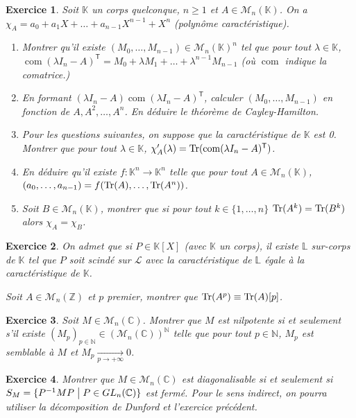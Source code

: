 \documentclass[12pt]{article}
\newtheorem{exercise}{Exercice}[section]
\theoremstyle{remark}
\theoremstyle{remark}
\newcommand{\K}{\mathbb{K}} \newcommand{\R}{\mathbb{R}}
\newcommand{\C}{\mathbb{C}} \newcommand{\Q}{\mathbb{Q}}
\newcommand{\N}{\mathbb{N}} \newcommand{\Z}{\mathbb{Z}}
\newcommand{\M}{\mathcal{M}} \renewcommand{\L}{\mathcal{L}}
\DeclareMathOperator{\com}{com} \DeclareMathOperator{\conv}{conv}
\begin{document}
\begin{exercise}
	Soit $\K$ un corps quelconque, $n\geqslant1$ et $A\in\M_{n}(\K)$. On a $\chi_{A}=a_{0}+a_{1}X+\dots+a_{n-1}X^{n-1}+X^{n}$ (polynôme caractéristique).
	\begin{enumerate}
		\item Montrer qu'il existe $(M_{0},\dots,M_{n-1})\in\M_{n}(\K)^{n}$ tel que pour tout $\lambda\in\K$, $\com(\lambda I_{n}-A)^{\mathsf{T}}=M_{0}+\lambda M_{1}+\dots+\lambda^{n-1}M_{n-1}$ (où $\com$ indique la comatrice.)
		\item En formant $(\lambda I_{n}-A)\com(\lambda I_{n}-A)^{\mathsf{T}}$, calculer $(M_{0},\dots,M_{n-1})$ en fonction de $A,A^{2},\dots,A^{n}$. En déduire le théorème de Cayley-Hamilton.
		\item Pour les questions suivantes, on suppose que la caractéristique de $\K$ est 0. Montrer que pour tout $\lambda\in\K$, $\chi_{A}'(\lambda)=\Tr(\com(\lambda I_{n}-A)^{\mathsf{T}})$.
		\item En déduire qu'il existe $f:\K^{n}\to\K^{n}$ telle que pour tout $A\in\M_{n}(\K)$, $(a_{0},\dots,a_{n-1}) = f(\operatorname{Tr}(A),\dots,\operatorname{Tr}(A^{n}))$.
		\item Soit $B\in\M_{n}(\K)$, montrer que si pour tout $k\in\{1,\dots,n\}$ $\operatorname{Tr}(A^{k})=\operatorname{Tr}(B^{k})$ alors $\chi_{A}=\chi_{B}$.
	\end{enumerate}
\end{exercise}

\begin{exercise}
	On admet que si $P\in\K[X]$ (avec $\K$ un corps), il existe $\mathbb{L}$ sur-corps de $\K$ tel que $P$ soit scindé sur $\L$ avec la caractéristique de $\mathbb{L}$ égale à la caractéristique de $\K$.

	Soit $A\in\M_{n}(\Z)$ et $p$ premier, montrer que $\operatorname{Tr}(A^{p})\equiv\operatorname{Tr}(A)[p]$.
\end{exercise}

\begin{exercise}
	Soit $M\in\M_{n}(\C)$. Montrer que $M$ est nilpotente si et seulement s'il existe $(M_{p})_{p\in\N}\in(\M_{n}(\C))^{\N}$ telle que pour tout $p\in\N$, $M_{p}$ est semblable à $M$ et $M_{p}\xrightarrow[p\to+\infty]{}0$.
\end{exercise}

\begin{exercise}
	Montrer que $M\in\M_{n}(\C)$ est diagonalisable si et seulement si $S_{M}=\{P^{-1}MP\bigm| P\in GL_{n}(\C)\}$ est fermé. Pour le sens indirect, on pourra utiliser la décomposition de Dunford et l'exercice précédent.
\end{exercise}
\end{document}
